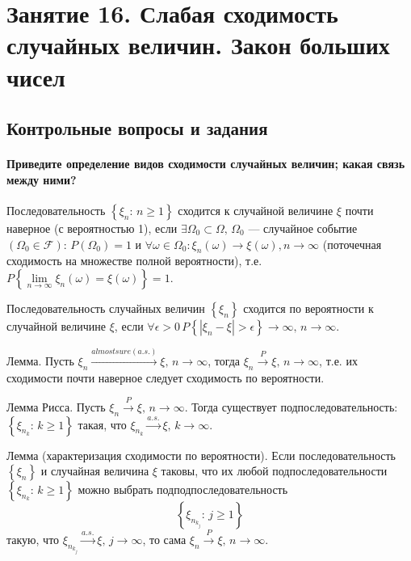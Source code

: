 \chapter*{Занятие 16. Слабая сходимость случайных величин. Закон больших чисел}

\section*{Контрольные вопросы и задания}

\subsubsection*{Приведите определение видов сходимости случайных величин; какая связь между ними?}

Последовательность $ \left\{ \xi_n: \, n \geq 1 \right\} $ сходится к случайной величине $ \xi $
почти наверное (с вероятностью 1),
если $ \exists \Omega_0 \subset \Omega, \, \Omega_0 $ ---
случайное событие $ \left( \Omega_0 \in \mathcal{F} \right): \, P \left( \Omega_0 \right) = 1$ и
$ \forall \omega \in \Omega_0:
\xi_n \left( \omega \right) \rightarrow \xi \left( \omega \right),
n \rightarrow \infty $
(поточечная сходимость на множестве полной вероятности),
т.е.
$P \left\{ \lim \limits_{n \to \infty} \xi_n \left( \omega \right) =
\xi \left( \omega \right) \right\} =
1$.

Последовательность случайных величин $ \left\{ \xi_n \right\} $
сходится по вероятности к случайной величине $ \xi $,
если
$ \forall \epsilon > 0 \,
P \left\{ \left| \xi_n - \xi \right| > \epsilon \right\} \rightarrow \infty, \,
n \rightarrow \infty $.

Лемма.
Пусть $ \xi_n \overset{almost sure (a.s.)}{ \rightarrow } \xi, \, n \rightarrow \infty $,
тогда $ \xi_n \overset{P}{ \rightarrow } \xi, \, n \rightarrow \infty $,
т.е. их сходимости почти наверное следует сходимость по вероятности.

Лемма Рисса.
Пусть $ \xi_n \overset{P}{ \rightarrow } \xi, \, n \rightarrow \infty $.
Тогда существует подпоследовательность: $ \left\{ \xi_{n_k}: \, k \geq 1 \right\} $ такая,
что $ \xi_{n_k} \overset{a.s.}{ \rightarrow } \xi, \, k \rightarrow \infty $.

Лемма (характеризация сходимости по вероятности).
Если последовательность $ \left\{ \xi_n \right\} $ и случайная величина $ \xi $ таковы,
что их любой подпоследовательности $ \left\{ \xi_{n_k}: \, k \geq 1 \right\} $
можно выбрать подподпоследовательность
$$ \left\{ \xi_{n_{k_j}}: \, j \geq 1 \right\} $$
такую,
что $ \xi_{n_{k_j}} \overset{a.s.}{ \rightarrow } \xi, \, j \rightarrow \infty $,
то сама $ \xi_n \overset{P}{ \rightarrow } \xi, \, n \rightarrow \infty $.

